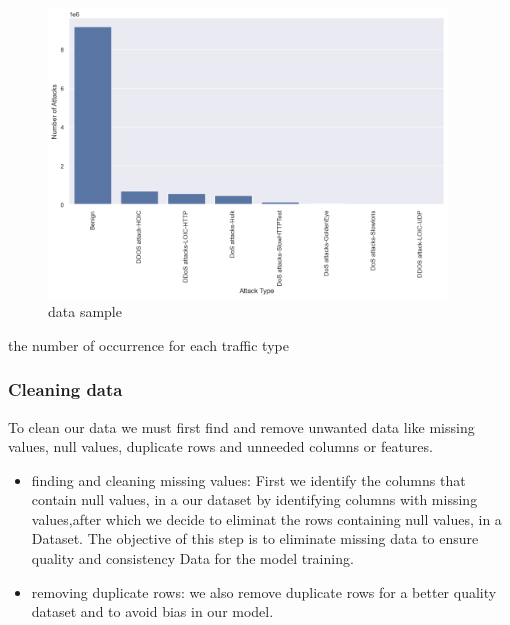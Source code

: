 \begin{figure}[h]
	\centering
	\includegraphics[width=400px]{figures/unbalanced_data.png}
	\caption{data sample}
	\label{fig:unbalanced_data}
\end{figure}

\begin{table}[h]
	\centering
	\caption{the number of occurrence for each traffic type}
	
	\label{tab:unbalanced_data_table} 
\end{table}


\newpage

\subsubsection{Cleaning data}
To clean our data we must first find and remove unwanted data like missing values, null values, duplicate rows and unneeded columns or features.


\firmlist
\begin{itemize}
	\item finding and cleaning missing values: First we identify the columns that contain null values, in a our dataset by identifying columns with missing values,after which we decide to eliminat the rows containing null values, in a Dataset. The objective of this step is to eliminate missing data to ensure quality and consistency Data for the model training.
	
	\item removing duplicate rows: we also remove duplicate rows for a better quality dataset and to avoid bias in our model.
	
\end{itemize}






